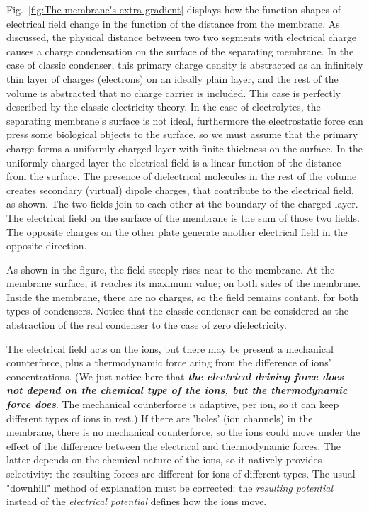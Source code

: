 Fig.~\ref{fig:The-membrane's-extra-gradient}
displays how the function shapes of electrical field
change in the function of the distance from the membrane. 
As discussed, the physical distance between two two segments
with electrical charge causes a charge condensation on the
surface of the separating membrane. In the case of classic condenser, this primary charge density 
is abstracted as an infinitely thin layer of charges (electrons)
on an ideally plain layer, and the rest of the volume is abstracted
that no charge carrier is included. This case is perfectly described by the classic electricity theory.
In the case of electrolytes, the separating membrane's surface is not ideal,
furthermore the electrostatic force can press some biological objects
to the surface, so we must assume that the primary charge forms a
uniformly charged layer with finite thickness on the surface.
In the uniformly charged layer the electrical field is a linear function
of the distance from the surface.
The presence of dielectrical molecules in the rest of the volume creates secondary (virtual) dipole charges, that contribute to the electrical field, as shown.
The two fields join to each other at the boundary
of the charged layer.
The electrical field on the surface of the membrane is the sum of those two fields.
The opposite charges on the other plate generate another electrical field in the opposite direction.

As shown in the figure, the field steeply rises near to the membrane.
At the membrane surface, it reaches its maximum value; on both sides of the membrane. Inside the membrane, there are no charges, so the field remains contant, for both types of condensers.
Notice that the classic condenser can be considered 
as the abstraction of the real condenser to the case of zero dielectricity.


The electrical field acts on the ions, but there may be present a mechanical counterforce,
plus a thermodynamic force aring from the difference of ions' concentrations.
(We just notice here that \textbf{\textit{the electrical driving force does not depend on the chemical type of the ions, but the thermodynamic force does}}.
The mechanical counterforce is adaptive, per ion, so it can keep different types of ions in rest.)
If there are 'holes' (ion channels) in the membrane, there is
no mechanical counterforce, so the ions could move under the effect of the difference between the electrical and thermodynamic forces.
The latter depends on the chemical nature of the ions, so it natively
provides selectivity: the resulting forces are different for ions of different types. The usual "downhill" method of explanation must
be corrected: the \textit{resulting potential} instead of the \textit{electrical potential} defines how the ions move.

